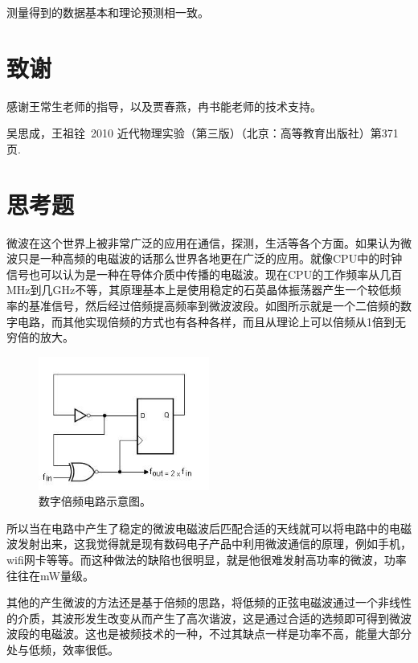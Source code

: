 \documentclass[aps,pre,12pt,preprint,onecolumn,showpacs,showkeys,UTF8]{revtex4-1}
\begin{document}
测量得到的数据基本和理论预测相一致。

\section{致谢}
感谢王常生老师的指导，以及贾春燕，冉书能老师的技术支持。



\begin{thebibliography}{}
	 吴思成，王祖铨~2010 近代物理实验（第三版）（北京：高等教育出版社）第371页.
%
%
\end{thebibliography}

\clearpage
\appendix
\section{思考题}
微波在这个世界上被非常广泛的应用在通信，探测，生活等各个方面。如果认为微波只是一种高频的电磁波的话那么世界各地更在广泛的应用。就像CPU中的时钟信号也可以认为是一种在导体介质中传播的电磁波。现在CPU的工作频率从几百MHz到几GHz不等，其原理基本上是使用稳定的石英晶体振荡器产生一个较低频率的基准信号，然后经过倍频提高频率到微波波段。如图所示就是一个二倍频的数字电路，而其他实现倍频的方式也有各种各样，而且从理论上可以倍频从1倍到无穷倍的放大。
\begin{figure}[h]
	\begin{center}
			\includegraphics[width=0.5\textwidth]{pic8.png}
		\caption{\label{fig:exp3}数字倍频电路示意图。}
	\end{center}
\end{figure}

所以当在电路中产生了稳定的微波电磁波后匹配合适的天线就可以将电路中的电磁波发射出来，这我觉得就是现有数码电子产品中利用微波通信的原理，例如手机，wifi网卡等等。而这种做法的缺陷也很明显，就是他很难发射高功率的微波，功率往往在mW量级。

其他的产生微波的方法还是基于倍频的思路，将低频的正弦电磁波通过一个非线性的介质，其波形发生改变从而产生了高次谐波，这是通过合适的选频即可得到微波波段的电磁波。这也是被频技术的一种，不过其缺点一样是功率不高，能量大部分处与低频，效率很低。
\end{document}
